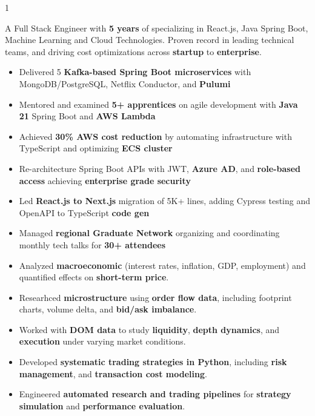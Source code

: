 \documentclass[11pt,a4paper,ragged2e]{altacv}
\begin{document}
\begin{paracol}{1}
\smallskip
{}

A Full Stack Engineer with \textbf{5 years} of specializing in React.js, Java Spring Boot, Machine Learning and Cloud Technologies. Proven record in leading technical teams, and driving cost optimizations across \textbf{startup} to \textbf{enterprise}.


\begin{itemize}
\item Delivered 5 \textbf{Kafka-based Spring Boot microservices} with MongoDB/PostgreSQL, Netflix Conductor, and \textbf{Pulumi}
\item Mentored and examined \textbf{5+ apprentices} on agile development with \textbf{Java 21} Spring Boot and \textbf{AWS Lambda}
\item Achieved \textbf{30\% AWS cost reduction} by automating infrastructure with TypeScript and optimizing \textbf{ECS cluster}
\item Re-architecture Spring Boot APIs with JWT, \textbf{Azure AD}, and \textbf{role-based access} achieving \textbf{enterprise grade security}
\item Led \textbf{React.js to Next.js} migration of 5K+ lines, adding Cypress testing and OpenAPI to TypeScript \textbf{code gen}
\item Managed \textbf{regional Graduate Network} organizing and coordinating monthly tech talks for \textbf{30+ attendees}
\end{itemize}
\tightdivider

\begin{itemize}
\item Analyzed \textbf{macroeconomic} (interest rates, inflation, GDP, employment) and quantified effects on \textbf{short-term price}.
\item Researhced \textbf{microstructure} using \textbf{order flow data}, including footprint charts, volume delta, and \textbf{bid/ask imbalance}.
\item Worked with \textbf{DOM data} to study \textbf{liquidity}, \textbf{depth dynamics}, and \textbf{execution} under varying market conditions.
\item Developed \textbf{systematic trading strategies in Python}, including \textbf{risk management}, and \textbf{transaction cost modeling}.
\item Engineered \textbf{automated research and trading pipelines} for \textbf{strategy simulation} and \textbf{performance evaluation}.
\end{itemize}
\tightdivider


\end{paracol}
\end{document}

